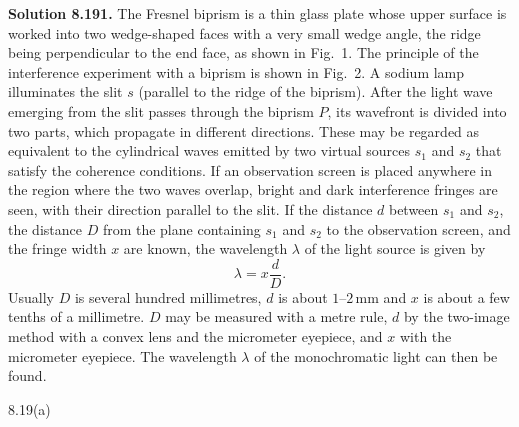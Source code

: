 \textbf{Solution 8.19}\quad \textbf{1.} The Fresnel biprism is a thin glass plate whose upper surface is worked into two wedge-shaped faces with a very small wedge angle, the ridge being perpendicular to the end face, as shown in Fig.~1. The principle of the interference experiment with a biprism is shown in Fig.~2. A sodium lamp illuminates the slit $s$ (parallel to the ridge of the biprism). After the light wave emerging from the slit passes through the biprism $P$, its wavefront is divided into two parts, which propagate in different directions. These may be regarded as equivalent to the cylindrical waves emitted by two virtual sources $s_1$ and $s_2$ that satisfy the coherence conditions. If an observation screen is placed anywhere in the region where the two waves overlap, bright and dark interference fringes are seen, with their direction parallel to the slit. If the distance $d$ between $s_1$ and $s_2$, the distance $D$ from the plane containing $s_1$ and $s_2$ to the observation screen, and the fringe width $x$ are known, the wavelength $\lambda$ of the light source is given by
\[
\lambda=x\frac{d}{D}.
\]
Usually $D$ is several hundred millimetres, $d$ is about $1$--$2\,\mathrm{mm}$ and $x$ is about a few tenths of a millimetre. $D$ may be measured with a metre rule, $d$ by the two-image method with a convex lens and the micrometer eyepiece, and $x$ with the micrometer eyepiece. The wavelength $\lambda$ of the monochromatic light can then be found.

\begin{figbox}{8.19(a)}
\end{figbox}

